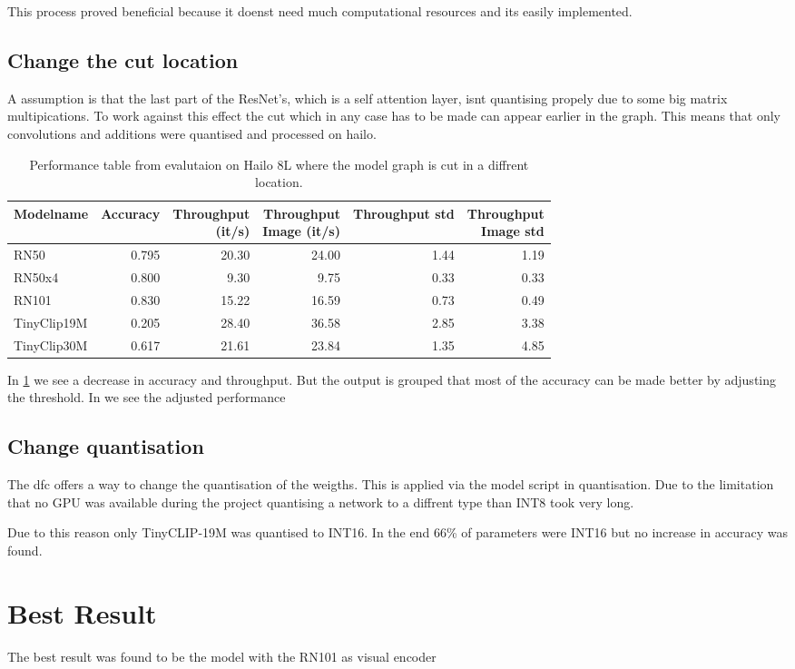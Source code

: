 This process proved beneficial because it doenst need much computational resources and its easily implemented.


\subsection{Change the cut location
\label{methods:sec:cutlocation}}
A assumption is that the last part of the ResNet's, which is a self attention layer, isnt quantising propely due to some big matrix multipications.
To work against this effect the cut which in any case has to be made can appear earlier in the graph.
This means that only convolutions and additions were quantised and processed on hailo.

\begin{table}[!ht]
    \centering
    \begin{tabular}{l|rrrrr}
        \hline
        Modelname & Accuracy & \makecell{Throughput\\(it/s)} & \makecell{Throughput \\ Image (it/s)} & Throughput std & \makecell{Throughput\\Image std} \\ \hline
        RN50 & 0.795 & 20.30 & 24.00 & 1.44 & 1.19 \\ 
        RN50x4 & 0.800 & 9.30 & 9.75 & 0.33 & 0.33 \\ 
        RN101 & 0.830 & 15.22 & 16.59 & 0.73 & 0.49 \\ 
        TinyClip19M & 0.205 & 28.40 & 36.58 & 2.85 & 3.38 \\ 
        TinyClip30M & 0.617 & 21.61 & 23.84 & 1.35 & 4.85 \\ 
    \end{tabular}
    \caption{Performance table from evalutaion on Hailo 8L where the model graph is cut in a diffrent location.}
    \label{methods:tab:perfHailocut}
\end{table}

In \cref{methods:tab:perfHailocut} we see a decrease in accuracy and throughput.
But the output is grouped that most of the accuracy can be made better by adjusting the threshold.
In %
we see the adjusted performance


\subsection{Change quantisation}

The \acrshort{dfc} offers a way to change the quantisation of the weigths.
This is applied via the model script in quantisation.
Due to the limitation that no GPU was available during the project quantising a network to a diffrent type than INT8 took very long.

Due to this reason only TinyCLIP-19M was quantised to INT16.
In the end 66\% of parameters were INT16  but no increase in accuracy was found.

\section{Best Result}

The best result was found to be the model with the RN101 as visual encoder